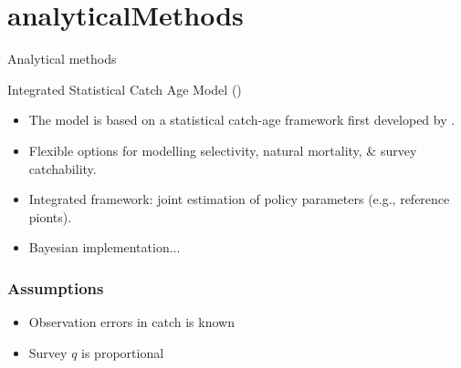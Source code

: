 \section{analyticalMethods} %
\label{sec:analyticalmethods}
%
\begin{frame} {Analytical methods} 
	
	\begin{block}
		{Integrated Statistical Catch Age Model (\iscam)}
		\begin{itemize}
			\item The model is based on a statistical catch-age framework first developed by \cite{fournier1982general}.
			
			\item Flexible options for modelling selectivity, natural mortality, \& survey catchability.
			
			\item Integrated framework: joint estimation of policy parameters (e.g., reference pionts).
			\item Bayesian implementation... 
		\end{itemize}
	\end{block}
\end{frame}
%
\begin{frame}[t]\frametitle{Assumptions}
	\begin{itemize}
		\item<+-> Observation errors in catch is known
		\item<+-> Survey $q$ is proportional
	\end{itemize}
\end{frame}

